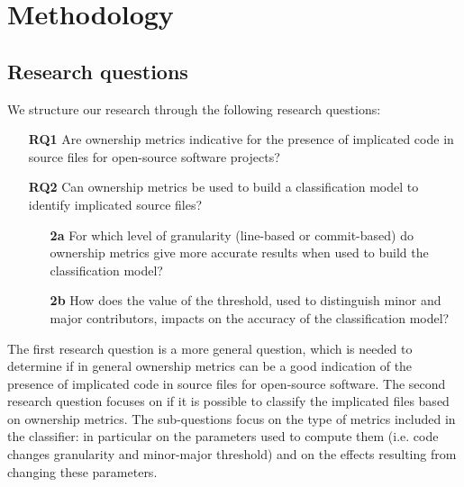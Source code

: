 \section{Methodology}

\subsection{Research questions}

We structure our research through the following research questions:

\begin{itemize}
    \item[\textbf{RQ1}] Are ownership metrics indicative for the presence of implicated code in source files for open-source software projects?
    
    \item[\textbf{RQ2}] Can ownership metrics be used to build a classification model to identify implicated source files?
    \begin{itemize}
        \item[\textbf{2a}] For which level of granularity (line-based or commit-based) do ownership metrics give more accurate results when used to build the classification model?
        \item[\textbf{2b}] How does the value of the threshold, used to distinguish minor and major contributors, impacts on the accuracy of the classification model?
    \end{itemize}
    
\end{itemize}

The first research question is a more general question, which is needed to determine if in general ownership metrics can be a good indication of the presence of implicated code in source files for open-source software. 
The second research question focuses on if it is possible to classify the implicated files based on ownership metrics. The sub-questions focus on the type of metrics included in the classifier: in particular on the parameters used to compute them (i.e. code changes granularity and minor-major threshold) and on the effects resulting from changing these parameters. %

